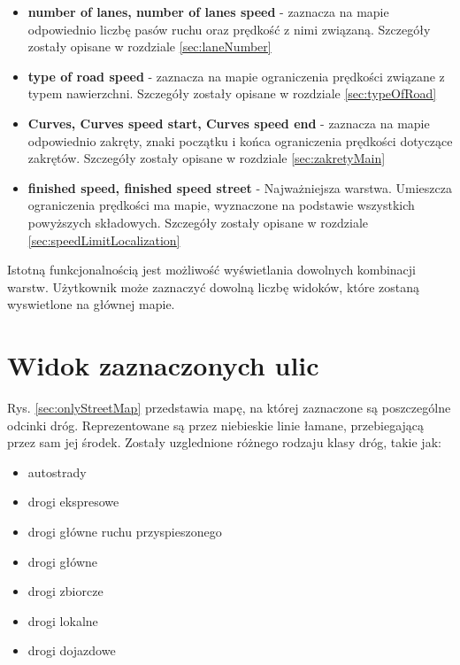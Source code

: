 \begin{itemize}
\item \textbf{number of lanes, number of lanes speed} - zaznacza na mapie odpowiednio liczbę pasów ruchu oraz prędkość z nimi związaną. Szczegóły zostały opisane w rozdziale \ref{sec:laneNumber}
\item \textbf{type of road speed} - zaznacza na mapie ograniczenia prędkości związane z typem nawierzchni. Szczegóły zostały opisane w rozdziale \ref{sec:typeOfRoad}
\item \textbf{Curves, Curves speed start, Curves speed end} - zaznacza na mapie odpowiednio zakręty, znaki początku i końca ograniczenia prędkości dotyczące zakrętów. Szczegóły zostały opisane w rozdziale \ref{sec:zakretyMain}
\item \textbf{finished speed, finished speed street} - Najważniejsza warstwa. Umieszcza ograniczenia prędkości ma mapie, wyznaczone na podstawie wszystkich powyższych składowych. Szczegóły zostały opisane w rozdziale \ref{sec:speedLimitLocalization}
\end{itemize}

Istotną funkcjonalnością jest możliwość wyświetlania dowolnych kombinacji warstw. Użytkownik może zaznaczyć dowolną liczbę widoków, które zostaną wyswietlone na głównej mapie.

\newpage
\section{Widok zaznaczonych ulic}
\label{sec:onlyStreet}

Rys. \ref{sec:onlyStreetMap} przedstawia mapę, na której zaznaczone są poszczególne odcinki dróg. Reprezentowane są przez niebieskie linie łamane, przebiegającą przez sam jej środek. Zostały uzglednione różnego rodzaju klasy dróg, takie jak: 
\begin{itemize}
\item autostrady
\item drogi ekspresowe
\item drogi główne ruchu przyspieszonego
\item drogi główne
\item drogi zbiorcze
\item drogi lokalne
\item drogi dojazdowe
\end{itemize}

